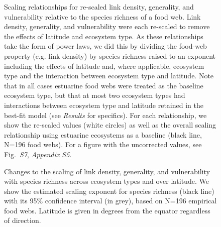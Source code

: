 \documentclass[12pt]{article}
\begin{document}
\begin{figure}[h]
\caption{Scaling relationships for re-scaled link density, generality, and vulnerability 
relative to the species richness of a food web. Link density, generality,
and vulnerability were each re-scaled to remove the effects of latitude and ecosystem
type. As these relationships take the form of power laws, we did this by dividing the food-web
property (e.g. link density) by species richness raised to an exponent including the 
effects of latitude and, where applicable, ecosystem type and the interaction between ecosystem
type and latitude. Note that in all cases estuarine food webs were treated as the baseline 
ecosystem type, but that at most two ecosystem types had interactions between ecosystem type and
latitude retained in the best-fit model (see \emph{Results} for specifics). For each relationship, 
we show the re-scaled values (white circles) as well as the overall scaling relationship using estuarine
ecosystems as a baseline (black line, N=196 food webs). For a figure with the uncorrected values,
see Fig.~\emph{S7}, \emph{Appendix S5}.}
\label{props_v_lat}
\end{figure}


\begin{figure}[h]
\caption{Changes to the scaling of link density, generality, and vulnerability with species richness across ecosystem
types and over latitude. We show the estimated scaling exponent for species richness (black
line) with its 95\% confidence interval (in grey), based on N=196 empirical food webs.
Latitude is given in degrees from the equator regardless of direction.} \label{S} \end{figure}


\end{document}
